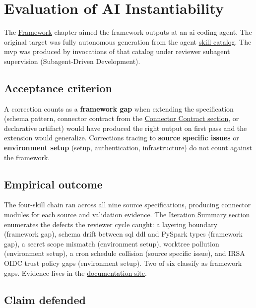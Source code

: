 \section*{Evaluation of AI Instantiability}
\label{sec:ai-eval}

The \hyperref[ch:framework]{Framework} chapter aimed the framework outputs at an \gls{ai} coding agent. The original target was fully autonomous generation from the agent \href{https://vkraus.github.io/appsec-mvp/connectors/scm/skills/}{skill catalog}. The \gls{mvp} was produced by invocations of that catalog under reviewer subagent supervision (Subagent-Driven Development).

\subsection*{Acceptance criterion}

A correction counts as a \textbf{framework gap} when extending the specification (schema pattern, connector contract from the \hyperref[sec:connector-contract]{Connector Contract section}, or declarative artifact) would have produced the right output on first pass and the extension would generalize. Corrections tracing to \textbf{source specific issues} or \textbf{environment setup} (setup, authentication, infrastructure) do not count against the framework.

\subsection*{Empirical outcome}

The four-skill chain ran across all nine source specifications, producing connector modules for each source and validation evidence. The \hyperref[sec:iteration-summary]{Iteration Summary section} enumerates the defects the reviewer cycle caught: a layering boundary (framework gap), schema drift between \gls{sql} \gls{ddl} and PySpark types (framework gap), a secret scope mismatch (environment setup), worktree pollution (environment setup), a cron schedule collision (source specific issue), and IRSA OIDC trust policy gaps (environment setup). Two of six classify as framework gaps. Evidence lives in the \href{https://vkraus.github.io/appsec-mvp/}{documentation site}.

\subsection*{Claim defended}

